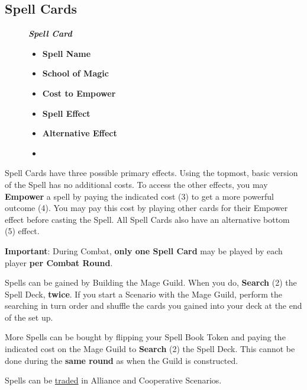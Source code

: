 \subsection*{\hypertarget{spells}{Spell Cards}}
\begin{wrapfigure}{R}{0.50\textwidth}
    \begin{center}
  \begin{minipage}[t][5cm][t]{0.50\textwidth}
    \centering
    \vspace{0pt}
    \footnotesize{\textbf{\textit{\textcolor{darkcandyapplered}{Spell Card}}}}
    \scriptsize
    \begin{multicols}{2}
    \begin{itemize}[itemsep=5pt]
        \item[\textbf{1.}] \textbf{Spell Name}
        \item[\textbf{2.}] \textbf{School of Magic}
        \item[\textbf{3.}] \textbf{Cost to Empower}
        \item[\textbf{4.}] \textbf{Spell Effect}
        \item[\textbf{5.}] \textbf{Alternative Effect}
        \item[]
    \end{itemize}
\end{multicols}
\end{minipage}\hfill
    \end{center}
\end{wrapfigure}


Spell Cards have three possible primary effects.
Using the topmost, basic version of the Spell has no additional costs.
To access the other effects, you may \textbf{Empower} a spell by paying the indicated cost (3) to get a more powerful outcome (4).
You may pay this cost by playing other cards for their Empower  effect before casting the Spell.
All Spell Cards also have an alternative bottom (5)  effect.\par

\textbf{Important}: During Combat, \textbf{only one Spell Card} may be played by each player \textbf{per Combat Round}.\par
Spells can be gained by Building the Mage Guild.
When you do, \textbf{Search} (2) the Spell Deck, \textbf{twice}.
If you start a Scenario with the Mage Guild, perform the searching in turn order and shuffle the cards you gained into your deck at the end of the set up.\par
More Spells can be bought by flipping your Spell Book Token and paying the indicated cost on the Mage Guild to \textbf{Search} (2) the Spell Deck.
This cannot be done during the \textbf{same round} as when the Guild is constructed.\par
Spells can be \hyperlink{Trading}{traded} in Alliance and Cooperative Scenarios.

